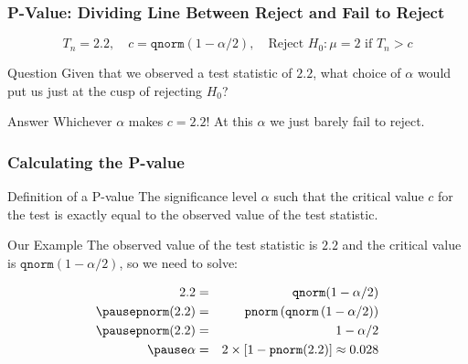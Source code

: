 \begin{frame}
  \frametitle{P-Value: Dividing Line Between Reject and Fail to Reject}

  \vspace{-2em}

  \[\boxed{T_n = 2.2, \quad c = \texttt{qnorm}(1 -\alpha/2), \quad \mbox{Reject } H_0\colon \mu = 2 \mbox{ if } T_n > c}\]

  \begin{block}{Question}
    Given that we observed a test statistic of $2.2$, what choice of $\alpha$ would put us \alert{just at the cusp} of rejecting $H_0$? 
  \end{block}

  \pause

  \begin{alertblock}{Answer}
    Whichever $\alpha$ makes $c = 2.2$!
    At this $\alpha$ we just \alert{barely} fail to reject.
  \end{alertblock}


\end{frame}
\begin{frame}
  \frametitle{Calculating the P-value}

  \begin{block}{Definition of a P-value}
    The significance level $\alpha$ such that the critical value $c$ for the test is \alert{exactly equal} to the observed value of the test statistic. 
  \end{block}

  \pause

  \begin{block}{Our Example}
    The observed value of the test statistic is $2.2$ and the critical value is $\texttt{qnorm}(1 - \alpha/2)$, so we need to solve:

    \vspace{-1em}

    \small
    \begin{eqnarray*}
      2.2 &=&  \texttt{qnorm}(1 - \alpha/2)\\ \pause
      \texttt{pnorm}(2.2) &=&  \texttt{pnorm}\left( \texttt{qnorm}\left( 1 - \alpha/2 \right) \right) \\ \pause
      \texttt{pnorm}(2.2) &=&  1 - \alpha/2\\ \pause
      \alpha &=& 2 \times \left[ 1 - \texttt{pnorm}(2.2) \right] \approx 0.028
    \end{eqnarray*}
  \end{block}



\end{frame}
